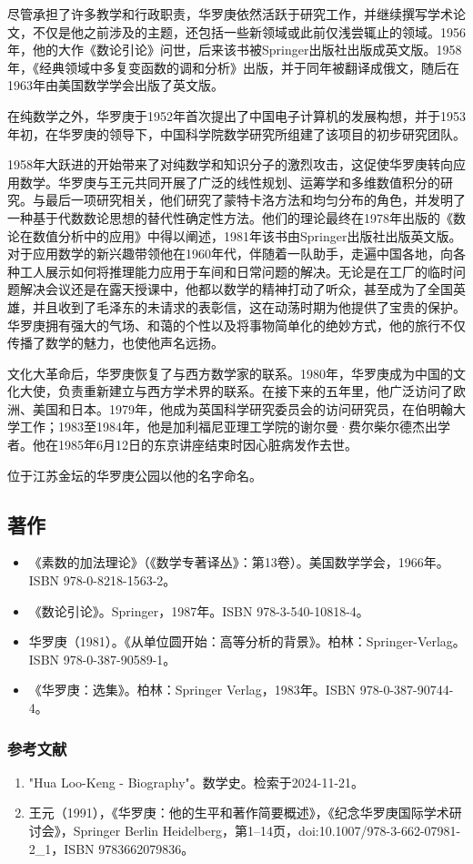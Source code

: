 尽管承担了许多教学和行政职责，华罗庚依然活跃于研究工作，并继续撰写学术论文，不仅是他之前涉及的主题，还包括一些新领域或此前仅浅尝辄止的领域。1956年，他的大作《数论引论》问世，后来该书被Springer出版社出版成英文版。1958年，《经典领域中多复变函数的调和分析》出版，并于同年被翻译成俄文，随后在1963年由美国数学学会出版了英文版。

在纯数学之外，华罗庚于1952年首次提出了中国电子计算机的发展构想，并于1953年初，在华罗庚的领导下，中国科学院数学研究所组建了该项目的初步研究团队。

1958年大跃进的开始带来了对纯数学和知识分子的激烈攻击，这促使华罗庚转向应用数学。华罗庚与王元共同开展了广泛的线性规划、运筹学和多维数值积分的研究。与最后一项研究相关，他们研究了蒙特卡洛方法和均匀分布的角色，并发明了一种基于代数数论思想的替代性确定性方法。他们的理论最终在1978年出版的《数论在数值分析中的应用》中得以阐述，1981年该书由Springer出版社出版英文版。对于应用数学的新兴趣带领他在1960年代，伴随着一队助手，走遍中国各地，向各种工人展示如何将推理能力应用于车间和日常问题的解决。无论是在工厂的临时问题解决会议还是在露天授课中，他都以数学的精神打动了听众，甚至成为了全国英雄，并且收到了毛泽东的未请求的表彰信，这在动荡时期为他提供了宝贵的保护。华罗庚拥有强大的气场、和蔼的个性以及将事物简单化的绝妙方式，他的旅行不仅传播了数学的魅力，也使他声名远扬。

文化大革命后，华罗庚恢复了与西方数学家的联系。1980年，华罗庚成为中国的文化大使，负责重新建立与西方学术界的联系。在接下来的五年里，他广泛访问了欧洲、美国和日本。1979年，他成为英国科学研究委员会的访问研究员，在伯明翰大学工作；1983至1984年，他是加利福尼亚理工学院的谢尔曼·费尔柴尔德杰出学者。他在1985年6月12日的东京讲座结束时因心脏病发作去世。

位于江苏金坛的华罗庚公园以他的名字命名。
\subsection{著作}  
\begin{itemize}
\item 《素数的加法理论》（《数学专著译丛》：第13卷）。美国数学学会，1966年。ISBN 978-0-8218-1563-2。  
\item 《数论引论》。Springer，1987年。ISBN 978-3-540-10818-4。  
\item 华罗庚（1981）。《从单位圆开始：高等分析的背景》。柏林：Springer-Verlag。ISBN 978-0-387-90589-1。  
\item 《华罗庚：选集》。柏林：Springer Verlag，1983年。ISBN 978-0-387-90744-4。
\end{itemize}
\subsubsection{参考文献}  
\begin{enumerate}
\item "Hua Loo-Keng - Biography"。数学史。检索于2024-11-21。  
\item 王元（1991），《华罗庚：他的生平和著作简要概述》，《纪念华罗庚国际学术研讨会》，Springer Berlin Heidelberg，第1–14页，doi:10.1007/978-3-662-07981-2_1，ISBN 9783662079836。
\end{enumerate}
